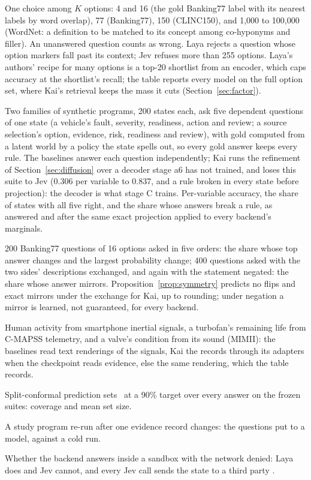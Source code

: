 \begin{description}[leftmargin=1.5em,style=nextline]
  \item[Cardinality.] One choice among $K$ options: 4 and 16 (the gold Banking77
    label with its nearest labels by word overlap), 77 (Banking77), 150
    (CLINC150), and 1{,}000 to 100{,}000 (WordNet: a definition to be matched to
    its concept among co-hyponyms and filler). An unanswered question counts
    as wrong. Laya rejects a question whose option markers fall past its
    context; Jev refuses more than 255 options. Laya's authors' recipe for many
    options is a top-20 shortlist from an encoder, which caps accuracy at the
    shortlist's recall; the table reports every model on the full option set,
    where Kai's retrieval keeps the mass it cuts (Section~\ref{sec:factor}).
  \item[Joint coherence.] Two families of synthetic programs, 200 states each,
    ask five dependent questions of one state (a vehicle's fault, severity,
    readiness, action and review; a source selection's option, evidence, risk,
    readiness and review), with gold computed from a latent world by a policy
    the state spells out, so every gold answer keeps every rule. The baselines
    answer each question independently; Kai runs the refinement of
    Section~\ref{sec:diffusion} over a decoder stage a6 has not trained, and
    loses this suite to Jev (0.306 per variable to 0.837, and a rule broken in
    every state before projection): the decoder is what stage C trains. Per-variable accuracy, the share of states with
    all five right, and the share whose answers break a rule, as answered and
    after the same exact projection applied to every backend's marginals.
  \item[Invariance.] 200 Banking77 questions of 16 options asked in five
    orders: the share whose top answer changes and the largest probability
    change; 400  questions asked with the two sides' descriptions
    exchanged, and again with the statement negated: the share whose answer
    mirrors. Proposition~\ref{prop:symmetry} predicts no flips and exact
    mirrors under the exchange for Kai, up to rounding; under negation a
    mirror is learned, not guaranteed, for every backend.
  \item[Media.] Human activity from smartphone inertial signals, a turbofan's
    remaining life from C-MAPSS telemetry, and a valve's condition from its
    sound (MIMII): the baselines read text renderings of the signals, Kai the
    records through its adapters when the checkpoint reads evidence, else the
    same rendering, which the table records.
  \item[Conformal sets.] Split-conformal prediction sets~\cite{vovk2005} at a
    90\% target over every answer on the frozen suites: coverage and mean set
    size.
  \item[Refresh.] A study program re-run after one evidence record changes:
    the questions put to a model, against a cold run.
  \item[Deployment.] Whether the backend answers inside a sandbox with the
    network denied: Laya does and Jev cannot, and every Jev call sends the state
    to a third party \meas.
\end{description}


